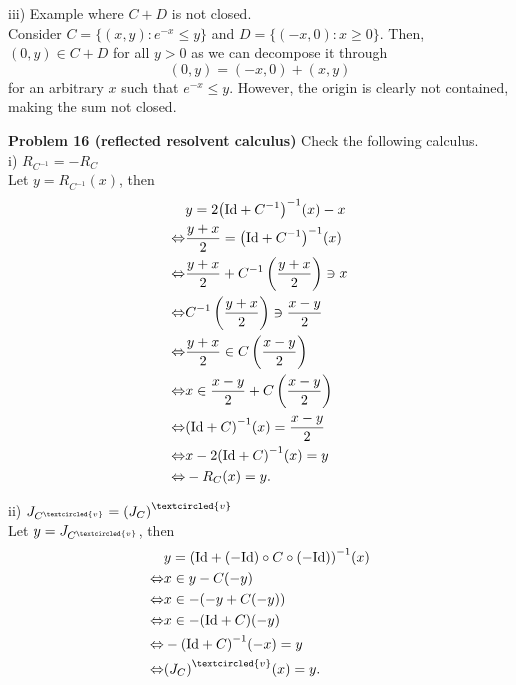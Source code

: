 \documentclass{scrartcl}
\theoremstyle{plain}
\theoremstyle{remark}
\newcommand{\Id}{\textup{Id}}
\newcommand{\ov}{\textcircled{v}}
\begin{document}
iii) Example where $C+D$ is not closed.\\
Consider $C=\{(x,y) : e^{-x} \le y\}$ and $D = \{(-x,0) : x \ge 0\}$. Then, $(0, y) \in C+D$ for all $y>0$ as we can decompose it through
\begin{equation}
  (0, y) = (-x, 0) + (x, y)
\end{equation}
for an arbitrary $x$ such that $e^{-x} \le y$. However, the origin is clearly not contained, making the sum not closed.

\textbf{Problem 16 (reflected resolvent calculus)} Check the following calculus. \\
i) $R_{C^{-1}} = - R_{C}$ \\
Let $y = R_{C^{-1}}(x)$, then
\begin{equation}
  \begin{aligned}
    &y = 2{\left(\Id + C^{-1}\right)}^{-1}(x) - x \\
    \Leftrightarrow& \frac{y+x}{2} = {\left(\Id + C^{-1}\right)}^{-1}(x) \\
    \Leftrightarrow& \frac{y+x}{2} + C^{-1}\left(\frac{y+x}{2}\right) \ni x \\
    \Leftrightarrow& C^{-1}\left(\frac{y+x}{2}\right) \ni \frac{x-y}{2} \\
    \Leftrightarrow& \frac{y+x}{2} \in  C \left( \frac{x-y}{2} \right) \\
    \Leftrightarrow& x \in \frac{x-y}{2} + C \left( \frac{x-y}{2} \right) \\
    \Leftrightarrow& {(\Id + C)}^{-1}(x) = \frac{x-y}{2} \\
    \Leftrightarrow& x-2{(\Id + C)}^{-1}(x) = y \\
    \Leftrightarrow& -R_{C}(x) = y.
  \end{aligned}
\end{equation}

ii) $J_{C^{\ov}} = {(J_{C})}^{\ov}$ \\
Let $y= J_{C^{\ov}}$, then
\begin{equation}
  \begin{aligned}
    &y= {(\Id + (-\Id) \circ C \circ (-\Id))}^{-1}(x) \\
    \Leftrightarrow& x \in y - C(-y) \\
    \Leftrightarrow& x \in - ( -y + C(-y)) \\
    \Leftrightarrow& x \in - {(\Id + C)}(-y) \\
    \Leftrightarrow& -{(\Id + C)}^{-1}(-x) = y \\
    \Leftrightarrow& {(J_{C})}^{\ov}(x) = y.
  \end{aligned}
\end{equation}
\end{document}
